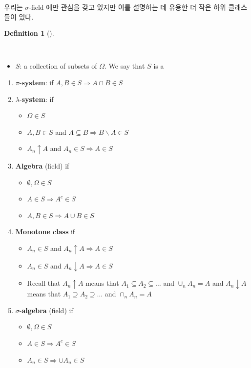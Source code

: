 \documentclass[
  letterpaper,
  DIV=11,
  numbers=noendperiod]{scrreprt}
\providecommand{\tightlist}{%
  \setlength{\itemsep}{0pt}\setlength{\parskip}{0pt}}
\theoremstyle{definition}
\theoremstyle{plain}
\theoremstyle{plain}
\theoremstyle{definition}
\theoremstyle{plain}
\theoremstyle{definition}
\newtheorem{definition}{Definition}[chapter]
\theoremstyle{remark}
\begin{document}
우리는 \(\sigma\)-field 에만 관심을 갖고 있지만 이를 설명하는 데 유용한
더 작은 하위 클래스들이 있다.

\begin{definition}[]\protect\hypertarget{def-algebra}{}\label{def-algebra}

~

\begin{itemize}
\tightlist
\item
  \(S\): a collection of subsets of \(\Omega\). We say that \(S\) is a
\end{itemize}

\begin{enumerate}
\def\labelenumi{\arabic{enumi}.}
\item
  \(\pi\)-\textbf{system}: if
  \(A, B \in S \Longrightarrow A\cap B \in S\)
\item
  \(\lambda\)-\textbf{system}: if

  \begin{itemize}
  \tightlist
  \item
    \(\Omega \in S\)
  \item
    \(A, B \in S\) and
    \(A \subseteq B \Longrightarrow B \backslash A \in S\)
  \item
    \(A_n \uparrow A\) and \(A_n \in S \Longrightarrow A \in S\)
  \end{itemize}
\item
  \textbf{Algebra} (field) if

  \begin{itemize}
  \tightlist
  \item
    \(\emptyset , \Omega \in S\)
  \item
    \(A \in S \Longrightarrow A^c \in S\)
  \item
    \(A, B \in S \Longrightarrow A\cup B \in S\)
  \end{itemize}
\item
  \textbf{Monotone class} if

  \begin{itemize}
  \tightlist
  \item
    \(A_n \in S\) and \(A_n \uparrow A \Longrightarrow A \in S\)
  \item
    \(A_n \in S\) and \(A_n \downarrow A \Longrightarrow A \in S\)
  \item
    Recall that \(A_n \uparrow A\) means that
    \(A_1 \subseteq A_2 \subseteq \ldots\) and \(\cup_n A_n = A\) and
    \(A_n \downarrow A\) means that
    \(A_1 \supseteq A_2 \supseteq \ldots\) and \(\cap_n A_n = A\)
  \end{itemize}
\item
  \(\sigma\)-\textbf{algebra} (field) if

  \begin{itemize}
  \tightlist
  \item
    \(\emptyset, \Omega \in S\)
  \item
    \(A \in S \Longrightarrow A^c \in S\)
  \item
    \(A_n \in S \Longrightarrow \cup A_n \in S\)
  \end{itemize}
\end{enumerate}

\end{definition}
\end{document}

